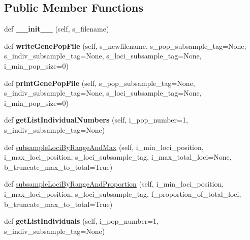 \subsection*{Public Member Functions}
\begin{DoxyCompactItemize}
\item 
def {\bfseries \+\_\+\+\_\+init\+\_\+\+\_\+} (self, s\+\_\+filename)\hypertarget{classnegui_1_1genepopfilemanager_1_1GenepopFileManager_a8563b3299666d02d45c9acd64f450c51}{}\label{classnegui_1_1genepopfilemanager_1_1GenepopFileManager_a8563b3299666d02d45c9acd64f450c51}

\item 
def {\bfseries write\+Gene\+Pop\+File} (self, s\+\_\+newfilename, s\+\_\+pop\+\_\+subsample\+\_\+tag=None, s\+\_\+indiv\+\_\+subsample\+\_\+tag=None, s\+\_\+loci\+\_\+subsample\+\_\+tag=None, i\+\_\+min\+\_\+pop\+\_\+size=0)\hypertarget{classnegui_1_1genepopfilemanager_1_1GenepopFileManager_a7390cad5840454284e816679a87d84df}{}\label{classnegui_1_1genepopfilemanager_1_1GenepopFileManager_a7390cad5840454284e816679a87d84df}

\item 
def {\bfseries print\+Gene\+Pop\+File} (self, s\+\_\+pop\+\_\+subsample\+\_\+tag=None, s\+\_\+indiv\+\_\+subsample\+\_\+tag=None, s\+\_\+loci\+\_\+subsample\+\_\+tag=None, i\+\_\+min\+\_\+pop\+\_\+size=0)\hypertarget{classnegui_1_1genepopfilemanager_1_1GenepopFileManager_a35aa30c43ab4a5e7762bf8c722314727}{}\label{classnegui_1_1genepopfilemanager_1_1GenepopFileManager_a35aa30c43ab4a5e7762bf8c722314727}

\item 
def {\bfseries get\+List\+Individual\+Numbers} (self, i\+\_\+pop\+\_\+number=1, s\+\_\+indiv\+\_\+subsample\+\_\+tag=None)\hypertarget{classnegui_1_1genepopfilemanager_1_1GenepopFileManager_a652029f0a6e0668e0b75c9683dae0ffd}{}\label{classnegui_1_1genepopfilemanager_1_1GenepopFileManager_a652029f0a6e0668e0b75c9683dae0ffd}

\item 
def \hyperlink{classnegui_1_1genepopfilemanager_1_1GenepopFileManager_a4334a9164415aa05de38ac7b31d59e40}{subsample\+Loci\+By\+Range\+And\+Max} (self, i\+\_\+min\+\_\+loci\+\_\+position, i\+\_\+max\+\_\+loci\+\_\+position, s\+\_\+loci\+\_\+subsample\+\_\+tag, i\+\_\+max\+\_\+total\+\_\+loci=None, b\+\_\+truncate\+\_\+max\+\_\+to\+\_\+total=True)
\item 
def \hyperlink{classnegui_1_1genepopfilemanager_1_1GenepopFileManager_af1dae6f9128c3c19ac204f518e838df1}{subsample\+Loci\+By\+Range\+And\+Proportion} (self, i\+\_\+min\+\_\+loci\+\_\+position, i\+\_\+max\+\_\+loci\+\_\+position, s\+\_\+loci\+\_\+subsample\+\_\+tag, f\+\_\+proportion\+\_\+of\+\_\+total\+\_\+loci, b\+\_\+truncate\+\_\+max\+\_\+to\+\_\+total=True)
\item 
def {\bfseries get\+List\+Individuals} (self, i\+\_\+pop\+\_\+number=1, s\+\_\+indiv\+\_\+subsample\+\_\+tag=None)\hypertarget{classnegui_1_1genepopfilemanager_1_1GenepopFileManager_aa6993dde24163002aeae55005437711d}{}\label{classnegui_1_1genepopfilemanager_1_1GenepopFileManager_aa6993dde24163002aeae55005437711d}


\end{DoxyCompactItemize}
